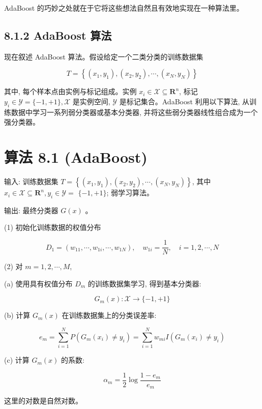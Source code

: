 \documentclass[10pt]{article}
\begin{document}
AdaBoost 的巧妙之处就在于它将这些想法自然且有效地实现在一种算法里。

\subsection*{8.1.2 AdaBoost 算法}
现在叙述 AdaBoost 算法。假设给定一个二类分类的训练数据集

$$
T=\left\{\left(x_{1}, y_{1}\right),\left(x_{2}, y_{2}\right), \cdots,\left(x_{N}, y_{N}\right)\right\}
$$

其中, 每个样本点由实例与标记组成。实例 $x_{i} \in \mathcal{X} \subseteq \boldsymbol{R}^{n}$, 标记 $y_{i} \in \mathcal{Y}=\{-1,+1\}, \mathcal{X}$ 是实例空间, $\mathcal{Y}$ 是标记集合。AdaBoost 利用以下算法, 从训练数据中学习一系列弱分类器或基本分类器, 并将这些弱分类器线性组合成为一个强分类器。

\section*{算法 8.1 (AdaBoost)}
输入: 训练数据集 $T=\left\{\left(x_{1}, y_{1}\right),\left(x_{2}, y_{2}\right), \cdots,\left(x_{N}, y_{N}\right)\right\}$, 其中 $x_{i} \in \mathcal{X} \subseteq \boldsymbol{R}^{n}, y_{i} \in \mathcal{Y}=$ $\{-1,+1\}$; 弱学习算法。

输出: 最终分类器 $G(x)$ 。

(1) 初始化训练数据的权值分布

$$
D_{1}=\left(w_{11}, \cdots, w_{1 i}, \cdots, w_{1 N}\right), \quad w_{1 i}=\frac{1}{N}, \quad i=1,2, \cdots, N
$$

(2) 对 $m=1,2, \cdots, M$,

(a) 使用具有权值分布 $D_{m}$ 的训练数据集学习, 得到基本分类器:

$$
G_{m}(x): \mathcal{X} \rightarrow\{-1,+1\}
$$

(b) 计算 $G_{m}(x)$ 在训练数据集上的分类误差率:


\begin{equation*}
e_{m}=\sum_{i=1}^{N} P\left(G_{m}\left(x_{i}\right) \neq y_{i}\right)=\sum_{i=1}^{N} w_{m i} I\left(G_{m}\left(x_{i}\right) \neq y_{i}\right) \tag{8.1}
\end{equation*}


(c) 计算 $G_{m}(x)$ 的系数:


\begin{equation*}
\alpha_{m}=\frac{1}{2} \log \frac{1-e_{m}}{e_{m}} \tag{8.2}
\end{equation*}


这里的对数是自然对数。
\end{document}
